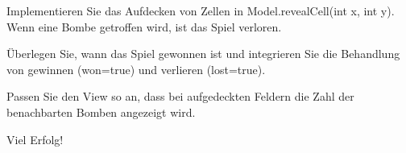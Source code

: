 \documentclass{article}
\begin{document}
\begin{subtask}
	Implementieren Sie das Aufdecken von Zellen in Model.revealCell(int x, int y). Wenn eine Bombe getroffen wird, ist das Spiel verloren.
\end{subtask}


\begin{subtask}
	Überlegen Sie, wann das Spiel gewonnen ist und integrieren Sie die Behandlung von gewinnen (won=true) und verlieren (lost=true).
\end{subtask}


\begin{subtask}
	Passen Sie den View so an, dass bei aufgedeckten Feldern die Zahl der benachbarten Bomben angezeigt wird.
\end{subtask}

Viel Erfolg!
\end{document}
